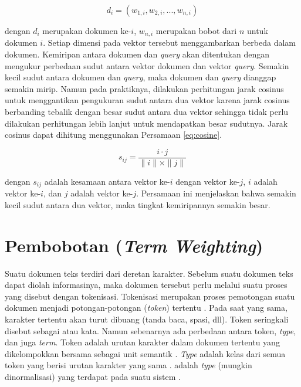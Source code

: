 \begin{equation}
\label{eq:vectors}
	d_i = (w_{1,i}, w_{2,i}, ..., w_{n,i})
\end{equation}

dengan $d_i$ merupakan dokumen ke-$i$, $w_{n,i}$ merupakan bobot dari \term $n$ untuk dokumen $i$. Setiap dimensi pada vektor tersebut menggambarkan \term berbeda dalam dokumen. Kemiripan antara dokumen dan \textit{query} akan ditentukan dengan mengukur perbedaan sudut antara vektor dokumen dan vektor \textit{query}. Semakin kecil sudut antara dokumen dan \textit{query}, maka dokumen dan \textit{query} dianggap semakin mirip. Namun pada praktiknya, dilakukan perhitungan jarak cosinus untuk menggantikan pengukuran sudut antara dua vektor karena jarak cosinus berbanding tebalik dengan besar sudut antara dua vektor sehingga tidak perlu dilakukan perhitungan lebih lanjut untuk mendapatkan besar sudutnya. Jarak cosinus dapat dihitung menggunakan Persamaan \ref{eq:cosine}.

\begin{equation}
\label{eq:cosine}
s_{ij}=\frac{i\cdot j}{\parallel i \parallel \times \parallel j \parallel}
\end{equation}

dengan $s_{ij}$ adalah kesamaan antara vektor ke-$i$ dengan vektor ke-$j$, $i$ adalah vektor ke-$i$, dan $j$ adalah vektor ke-$j$. Persamaan ini menjelaskan bahwa semakin kecil sudut antara dua vektor, maka tingkat kemiripannya semakin besar.  

\section{Pembobotan \Term (\textit{Term Weighting})}
\label{sec:termWeight}
Suatu dokumen teks terdiri dari deretan karakter. Sebelum suatu dokumen teks dapat diolah informasinya, maka dokumen tersebut perlu melalui suatu proses yang disebut dengan tokenisasi. Tokenisasi merupakan proses pemotongan suatu dokumen menjadi potongan-potongan (\textit{token}) tertentu \cite{schutze2008introduction}. Pada saat yang sama, karakter tertentu akan turut dibuang (tanda baca, spasi, dll). Token seringkali disebut sebagai \term atau kata. Namun sebenarnya ada perbedaan antara token, \textit{type}, dan juga \textit{term}. Token adalah urutan karakter dalam dokumen tertentu yang dikelompokkan bersama sebagai unit semantik \cite{schutze2008introduction}. \textit{Type} adalah kelas dari semua token yang berisi urutan karakter yang sama \cite{schutze2008introduction}. \Term adalah \textit{type} (mungkin dinormalisasi) yang terdapat pada suatu sistem \cite{schutze2008introduction}.

